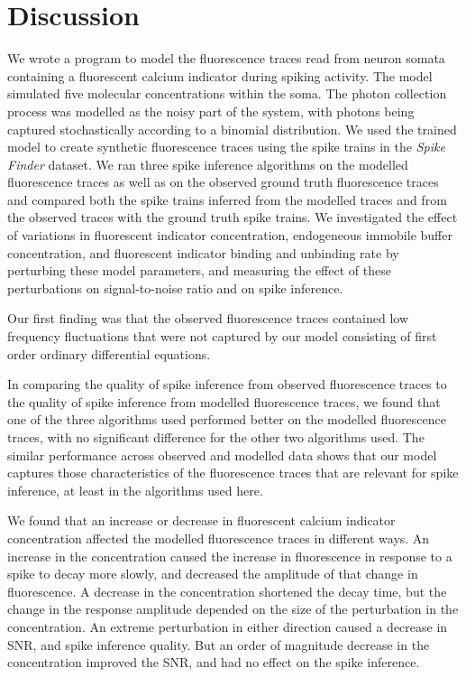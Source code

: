 \documentclass[a4paper,12pt]{article}
\theoremstyle{definition}
\begin{document}
\section{Discussion}
We wrote a program to model the fluorescence traces read from neuron somata containing a fluorescent calcium indicator during spiking activity. The model simulated five molecular concentrations within the soma. The photon collection process was modelled as the noisy part of the system, with photons being captured stochastically according to a binomial distribution. We used the trained model to create synthetic fluorescence traces using the spike trains in the \textit{Spike Finder} dataset. We ran three spike inference algorithms on the modelled fluorescence traces as well as on the observed ground truth fluorescence traces and compared both the spike trains inferred from the modelled traces and from the observed traces with the ground truth spike trains. We investigated the effect of variations in fluorescent indicator concentration, endogeneous immobile buffer concentration, and fluorescent indicator binding and unbinding rate by perturbing these model parameters, and measuring the effect of these perturbations on signal-to-noise ratio and on spike inference.

Our first finding was that the observed fluorescence traces contained low frequency fluctuations that were not captured by our model consisting of first order ordinary differential equations.

In comparing the quality of spike inference from observed fluorescence traces to the quality of spike inference from modelled fluorescence traces, we found that one of the three algorithms used performed better on the modelled fluorescence traces, with no significant difference for the other two algorithms used. The similar performance across observed and modelled data shows that our model captures those characteristics of the fluorescence traces that are relevant for spike inference, at least in the algorithms used here.

We found that an increase or decrease in fluorescent calcium indicator concentration affected the modelled fluorescence traces in different ways. An increase in the concentration caused the increase in fluorescence in response to a spike to decay more slowly, and decreased the amplitude of that change in fluorescence. A decrease in the concentration shortened the decay time, but the change in the response amplitude depended on the size of the perturbation in the concentration. An extreme perturbation in either direction caused a decrease in SNR, and spike inference quality. But an order of magnitude decrease in the concentration improved the SNR, and had no effect on the spike inference.
\end{document}
